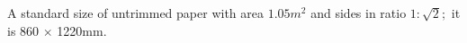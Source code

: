 A standard size of untrimmed paper with area $1.05m^{2}$  and sides in ratio
$ 1 : \sqrt{2} ; $ it is 860 \ensuremath{ \times } 1220mm.